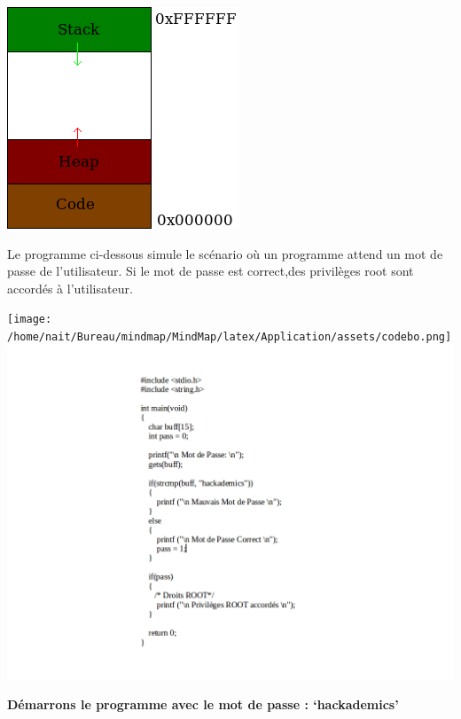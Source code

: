 \begin{center}
\includegraphics[scale=0.5]{Application/assets/stack.png}
\end{center}

\begin{flushleft}
Le programme ci-dessous simule le scénario où un programme attend un mot de passe de l'utilisateur. Si le mot de passe est correct,des privilèges root sont accordés à l'utilisateur.
\end{flushleft}

\begin{center}
\texttt{[image: /home/nait/Bureau/mindmap/MindMap/latex/Application/assets/codebo.png]}
\vspace{0.5cm}
\includegraphics[scale=0.3]{Application/assets/codebo.png}
\vspace{0.5cm}
\end{center}

\begin{flushleft}
\textbf{Démarrons le programme avec le mot de passe : ‘hackademics'}
\end{flushleft}

